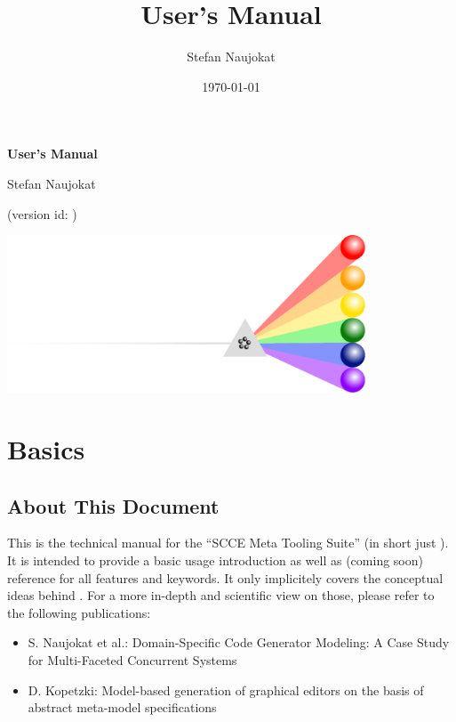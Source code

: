 \documentclass[a4paper,american,12pt]{scrreprt}
\begin{document}
\title{\cinco User's Manual}
\author{Stefan Naujokat}
\date{\today}

\begin{titlepage}

\vspace*{3cm}

\makebox[2.5cm]{}
\begin{minipage}{8.0cm}
\begin{center}
	{\huge\bfseries \cinco{} User's Manual}

	\vspace{1.5em}

	{\large Stefan Naujokat}

	\vspace{1.5em}

	{\large (version id: \gitAbbrevHash{})}
\end{center}
 \end{minipage}

\vspace{-4em}

\includegraphics[width=0.8\textwidth]{figures/cinco-logo.pdf}

\vfill
\end{titlepage}


\chapter{Basics}

\section{About This Document}

This is the technical manual for the ``\cinco SCCE Meta Tooling Suite'' (in
short just \cinco). It is intended to provide a basic usage introduction as
well as (coming soon) reference for all features and keywords. It only implicitely covers the
conceptual ideas behind \cinco. For a more in-depth and scientific view on those,
please refer to the following publications:
%
\begin{itemize}
\item S. Naujokat et al.: Domain-Specific Code Generator Modeling: A Case Study for
Multi-Faceted Concurrent Systems \cite{NaTISL2014}
\item D. Kopetzki: Model-based generation of graphical editors on
the basis of abstract meta-model specifications \cite{Kopetz2014}
\end{itemize}
\end{document}
